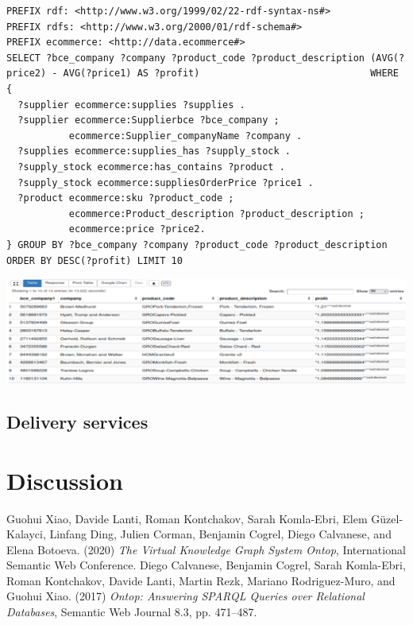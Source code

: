 \documentclass{article}
\begin{document}
\begin{lstlisting}[breaklines, frame=single]
PREFIX rdf: <http://www.w3.org/1999/02/22-rdf-syntax-ns#>
PREFIX rdfs: <http://www.w3.org/2000/01/rdf-schema#>
PREFIX ecommerce: <http://data.ecommerce#>
SELECT ?bce_company ?company ?product_code ?product_description (AVG(?price2) - AVG(?price1) AS ?profit)                              WHERE {
  ?supplier ecommerce:supplies ?supplies .
  ?supplier ecommerce:Supplierbce ?bce_company ;
           ecommerce:Supplier_companyName ?company .
  ?supplies ecommerce:supplies_has ?supply_stock .
  ?supply_stock ecommerce:has_contains ?product .
  ?supply_stock ecommerce:suppliesOrderPrice ?price1 .
  ?product ecommerce:sku ?product_code ;
           ecommerce:Product_description ?product_description ;
           ecommerce:price ?price2.
} GROUP BY ?bce_company ?company ?product_code ?product_description ORDER BY DESC(?profit) LIMIT 10
\end{lstlisting}

\begin{center}
   \includegraphics[scale=0.25]{OISreport-supplier-query.png}
\end{center}



\subsection{Delivery services}





\section{Discussion}



\begin{thebibliography}{99}
Guohui Xiao, Davide Lanti, Roman Kontchakov, Sarah Komla-Ebri, Elem Güzel-Kalayci, Linfang Ding, Julien Corman, Benjamin Cogrel, Diego Calvanese, and Elena Botoeva. (2020) \emph{The Virtual Knowledge Graph System Ontop}, International Semantic Web Conference.
Diego Calvanese, Benjamin Cogrel, Sarah Komla-Ebri, Roman Kontchakov, Davide Lanti, Martin Rezk, Mariano Rodriguez-Muro, and Guohui Xiao. (2017) \emph{Ontop: Answering SPARQL Queries over Relational Databases}, Semantic Web Journal 8.3, pp. 471–487.
\end{thebibliography}
\end{document}
